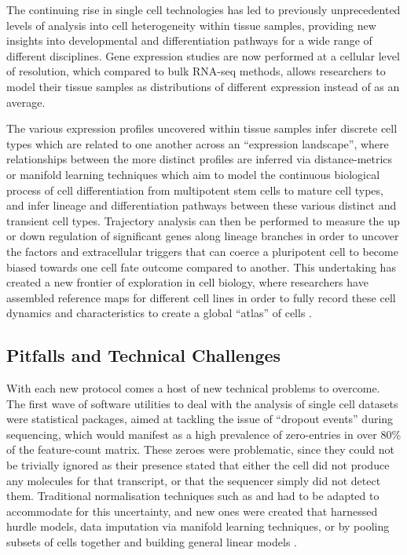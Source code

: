 \documentclass[a4paper,num-refs]{oup-contemporary}
\begin{document}
The continuing rise in single cell technologies has led to previously unprecedented levels of analysis into cell heterogeneity within tissue samples, providing new insights into developmental and differentiation pathways for a wide range of different disciplines. Gene expression studies are now performed at a cellular level of resolution, which compared to bulk RNA-seq methods, allows researchers to model their tissue samples as distributions of different expression instead of as an average.

The various expression profiles uncovered within tissue samples infer discrete cell types which are related to one another across an ``expression landscape'', where relationships between the more distinct profiles are inferred via distance-metrics or manifold learning techniques which aim to model the continuous biological process of cell differentiation from multipotent stem cells to mature cell types, and infer lineage and differentiation pathways between these various distinct and transient cell types. Trajectory analysis can then be performed to measure the up or down regulation of significant genes along lineage branches in order to uncover the factors and extracellular triggers that can coerce a pluripotent cell to become biased towards one cell fate outcome compared to another. This undertaking has created a new frontier of exploration in cell biology, where researchers have assembled reference maps for different cell lines in order to fully record these cell dynamics and characteristics to create a global ``atlas'' of cells \citep{rozenblatt2017human}.

\subsection{Pitfalls and Technical Challenges}
With each new protocol comes a host of new technical problems to overcome. The first wave of software utilities to deal with the analysis of single cell datasets were statistical packages, aimed at tackling the issue of ``dropout events'' during sequencing, which would manifest as a high prevalence of zero-entries in over 80\% of the feature-count matrix. These zeroes were problematic, since they could not be trivially ignored as their presence stated that either the cell did not produce any molecules for that transcript, or that the sequencer simply did not detect them. Traditional normalisation techniques such as  and  had to be adapted to accommodate for this uncertainty, and new ones were created that harnessed hurdle models, data imputation via manifold learning techniques, or by pooling subsets of cells together and building general linear models \citep{camara2018methods}.
\end{document}
